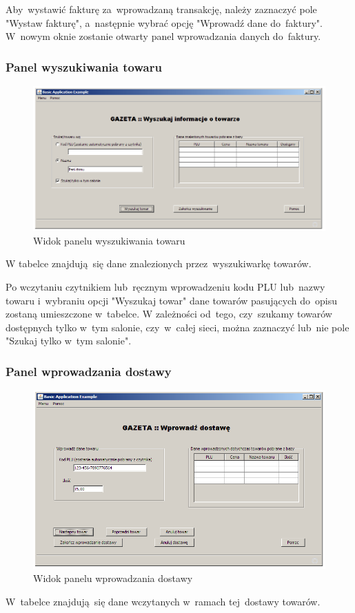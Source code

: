 Aby~wystawić fakturę za~wprowadzaną transakcję, należy zaznaczyć pole "Wystaw fakturę", a~następnie wybrać opcję "Wprowadź dane do~faktury". W~nowym oknie zostanie otwarty panel wprowadzania danych do~faktury.
\clearpage
\subsubsection{Panel wyszukiwania towaru}
\begin{figure}[h]
\begin{center}
\includegraphics[width=20cm,angle=90,keepaspectratio]{gfx/wyszukaj_produkt.png}
\end{center}
\caption{Widok panelu wyszukiwania towaru}
\end{figure}
W tabelce znajdują~się dane znalezionych przez~wyszukiwarkę towarów.

Po wczytaniu czytnikiem lub~ręcznym wprowadzeniu kodu PLU lub~nazwy towaru i~wybraniu opcji "Wyszukaj towar" dane towarów pasujących do~opisu zostaną umieszczone w~tabelce.
W zależności od~tego, czy~szukamy towarów dostępnych tylko w~tym salonie, czy~w~całej sieci, można zaznaczyć lub~nie pole "Szukaj tylko w~tym salonie".
\clearpage
\subsubsection{Panel wprowadzania dostawy}
\begin{figure}[h]
\begin{center}
\includegraphics[width=20cm,angle=90,keepaspectratio]{gfx/dostawa.png}
\end{center}
\caption{Widok panelu wprowadzania dostawy}
\end{figure}
W~tabelce znajdują~się dane wczytanych w~ramach tej~dostawy towarów.

